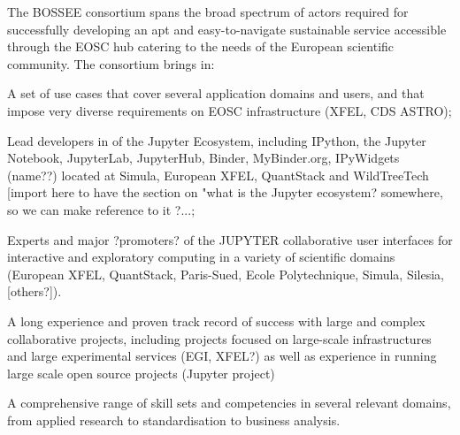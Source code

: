 


The BOSSEE consortium spans the broad spectrum of actors required for successfully developing an apt and easy-to-navigate sustainable service accessible through the EOSC hub catering to the needs of the European scientific community. The consortium brings in:
\begin{compactitem}
\item A set of use cases that cover several application domains and users, and that impose very diverse requirements on EOSC infrastructure (XFEL, CDS ASTRO);
\item Lead developers in of the Jupyter Ecosystem, including IPython, the Jupyter Notebook, JupyterLab, JupyterHub, Binder, MyBinder.org, IPyWidgets (name??) located at Simula, European XFEL, QuantStack and WildTreeTech [import here to have the section on "what is the Jupyter ecosystem? somewhere, so we can make reference to it ?...;
\item Experts and major ?promoters? of the JUPYTER collaborative user interfaces for interactive and exploratory computing in a variety of scientific domains (European XFEL, QuantStack, Paris-Sued, Ecole Polytechnique, Simula, Silesia, [others?]).
\item A long experience and proven track record of success with large and complex collaborative projects, including projects focused on large-scale infrastructures and large experimental services (EGI, XFEL?) as well as experience in running large scale open source projects (Jupyter project)
\item A comprehensive range of skill sets and competencies in several relevant domains, from applied research to standardisation to business
analysis.
\end{compactitem}

